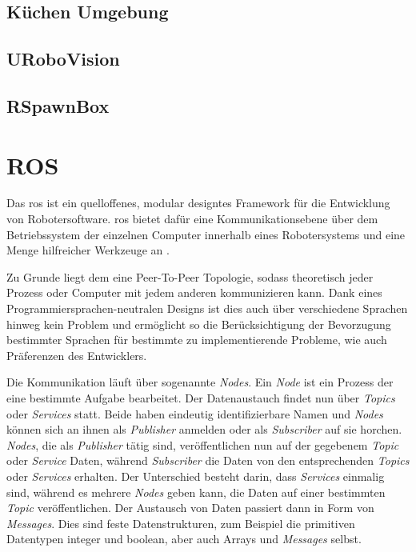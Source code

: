 \subsection{Küchen Umgebung}
\label{chap:kitchenenvironment}

\subsection{URoboVision}
\label{chap:urobovision}

\subsection{RSpawnBox}
\label{chap:rspawnbox}

\section{ROS}
\label{chap:ros}
Das \gls{ros} ist ein quelloffenes, modular designtes Framework für die Entwicklung von Robotersoftware. \gls{ros} bietet dafür eine Kommunikationsebene über dem Betriebssystem der einzelnen Computer innerhalb eines Robotersystems und eine Menge hilfreicher Werkzeuge an \cite{qui}.\par 

Zu Grunde liegt dem eine Peer-To-Peer Topologie, sodass theoretisch jeder Prozess oder Computer mit jedem anderen kommunizieren kann. Dank eines Programmiersprachen-neutralen Designs ist dies auch über verschiedene Sprachen hinweg kein Problem und ermöglicht so die Berücksichtigung der Bevorzugung bestimmter Sprachen für bestimmte zu implementierende Probleme, wie auch Präferenzen des Entwicklers.\par

Die Kommunikation läuft über sogenannte \textit{Nodes}. Ein \textit{Node} ist ein Prozess der eine bestimmte Aufgabe bearbeitet. Der Datenaustauch findet nun über \textit{Topics} oder \textit{Services} statt. Beide haben eindeutig identifizierbare Namen und \textit{Nodes} können sich an ihnen als \textit{Publisher} anmelden oder als \textit{Subscriber} auf sie horchen. \textit{Nodes}, die als \textit{Publisher} tätig sind, veröffentlichen nun auf der gegebenem \textit{Topic} oder \textit{Service} Daten, während \textit{Subscriber} die Daten von den entsprechenden \textit{Topics} oder \textit{Services} erhalten. Der Unterschied besteht darin, dass \textit{Services} einmalig sind, während es mehrere \textit{Nodes} geben kann, die Daten auf einer bestimmten \textit{Topic} veröffentlichen. Der Austausch von Daten passiert dann in Form von \textit{Messages}. Dies sind feste Datenstrukturen, zum Beispiel die primitiven Datentypen integer und boolean, aber auch Arrays und \textit{Messages} selbst. \par

